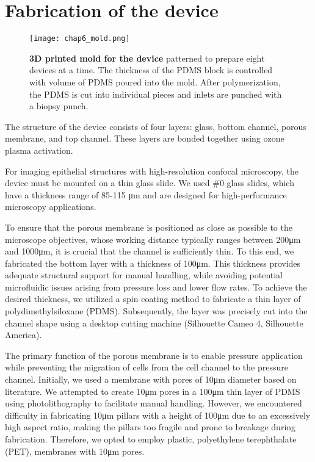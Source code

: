 \hypertarget{fabrication-of-the-device}{%
\section{Fabrication of the device}\label{fabrication-of-the-device}}

\begin{figure}[b!]
	\centering
	\texttt{[image: chap6\_mold.png]}
	\caption{ \textbf{3D printed mold for the device} patterned to prepare eight devices at a time. The thickness of the PDMS block is controlled with volume of PDMS poured into the mold. After polymerization, the PDMS is cut into individual pieces and inlets are punched with a biopsy punch.}\label{fig_6_1a}
\end{figure}

The structure of the device consists of four layers: glass, bottom channel, porous membrane, and top channel. These layers are bonded together using ozone plasma activation.

For imaging epithelial structures with high-resolution confocal microscopy, the device must be mounted on a thin glass slide. We used \#0 glass slides, which have a thickness range of 85-115 \unit{\um} and are designed for high-performance microscopy applications. 

To ensure that the porous membrane is positioned as close as possible to the microscope objectives, whose working distance typically ranges between 200\unit{\um} and 1000\unit{\um}, it is crucial that the channel is sufficiently thin. To this end, we fabricated the bottom layer with a thickness of 100\unit{\um}. This thickness provides adequate structural support for manual handling, while avoiding potential microfluidic issues arising from pressure loss and lower flow rates. To achieve the desired thickness, we utilized a spin coating method to fabricate a thin layer of polydimethylsiloxane (PDMS). Subsequently, the layer was precisely cut into the channel shape using a desktop cutting machine (Silhouette Cameo 4, Silhouette America).

The primary function of the porous membrane is to enable pressure application while preventing the migration of cells from the cell channel to the pressure channel. Initially, we used a membrane with pores of 10\unit{\um} diameter based on literature. We attempted to create 10\unit{\um} pores in a 100\unit{\um} thin layer of PDMS using photolithography to facilitate manual handling. However, we encountered difficulty in fabricating 10\unit{\um} pillars with a height of 100\unit{\um} due to an excessively high aspect ratio, making the pillars too fragile and prone to breakage during fabrication. Therefore, we opted to employ plastic, polyethylene terephthalate (PET), membranes with 10\unit{\um} pores. 

